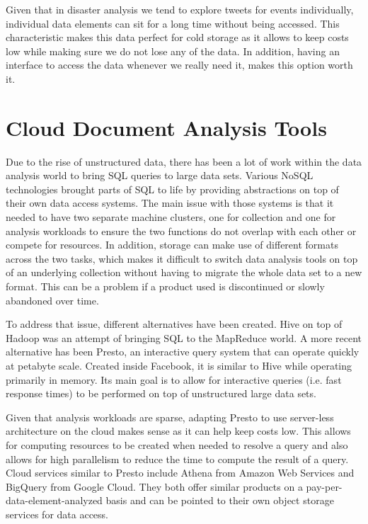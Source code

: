 Given that in disaster analysis we tend to explore tweets for events individually, individual data elements can sit for a long time without being accessed. This characteristic makes this data perfect for cold storage as it allows to keep costs low while making sure we do not lose any of the data. In addition, having an interface to access the data whenever we really need it, makes this option worth it. 

\section{Cloud Document Analysis Tools} 

Due to the rise of unstructured data, there has been a lot of work within the data analysis world to bring SQL queries to large data sets. Various NoSQL technologies brought parts of SQL to life by providing abstractions on top of their own data access systems. The main issue with those systems is that it needed to have two separate machine clusters, one for collection and one for analysis workloads to ensure the two functions do not overlap with each other or compete for resources. In addition, storage can make use of different formats across the two tasks, which makes it difficult to switch data analysis tools on top of an underlying collection without having to migrate the whole data set to a new format. This can be a problem if a product used is discontinued or slowly abandoned over time.

To address that issue, different alternatives have been created. Hive on top of Hadoop was an attempt of bringing SQL to the MapReduce world. A more recent alternative has been Presto, an interactive query system that can operate quickly at petabyte scale. Created inside Facebook, it is similar to Hive while operating primarily in memory. Its main goal is to allow for interactive queries (i.e. fast response times) to be performed on top of unstructured large data sets. 

Given that analysis workloads are sparse, adapting Presto to use server-less architecture on the cloud makes sense as it can help keep costs low. This allows for computing resources to be created when needed to resolve a query and also allows for high parallelism to reduce the time to compute the result of a query. Cloud services similar to Presto include Athena from Amazon Web Services and BigQuery from Google Cloud. They both offer similar products on a pay-per-data-element-analyzed basis and can be pointed to their own object storage services for data access.

